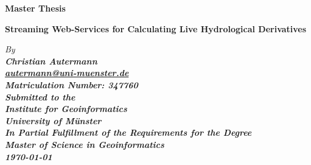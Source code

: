\documentclass[paper=a4,
               fontsize=11pt,
               bibliography=totoc,
               listof=nochaptergap,
               listof=notoc,
               numbers=noendperiod,
               parskip=half,
               footnotes=multiple,
               toc=numberline,
               captions=tableheading,
               DIV=10,
              ]{scrreprt}
\newcommand{\mail}[1]{\href{mailto:#1}{#1}}
\renewenvironment{bold}{\bfseries}{}
\newenvironment{italic}{\itshape}{}
\newenvironment{sansserif}{\sffamily}{}
\begin{document}
  \begin{titlepage}
    \begin{spacing}{1}
      \onehalfspacing
      \begin{center}
        \begin{large}
          \textbf{Master Thesis}\\
          \vspace{1cm}
          \begin{huge}
            \begin{bold}
              \begin{sansserif}
                Streaming Web-Services for Calculating Live Hydrological Derivatives\\
              \end{sansserif}
            \end{bold}
          \end{huge}
          \vspace*{1cm}
          \begin{italic}
            By\\
          \end{italic}
          \begin{bold}
            Christian Autermann\\
          \end{bold}
          \mail{autermann@uni-muenster.de}\\
          Matriculation Number: 347760\\
          \vspace{1cm}
          \begin{italic}
            Submitted to the\\
          \end{italic}
          Institute for Geoinformatics\\
          University of Münster\\
          \vspace{1cm}
          \begin{italic}
            In Partial Fulfillment of the Requirements for the Degree\\
          \end{italic}
          Master of Science in Geoinformatics\\
          \vspace{1cm}
          \begin{bold}
            \today\\
          \end{bold}
          \vspace*{\fill}

\end{large}
\end{center}
\end{spacing}
\end{titlepage}
\end{document}
